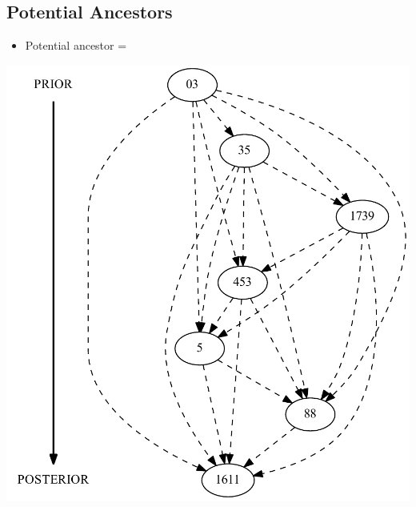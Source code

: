 \documentclass[10pt]{beamer}
\begin{document}
	\subsection{Potential Ancestors}
	\begin{frame}
		\begin{itemize}
			\item Potential ancestor = 
		\end{itemize}
		\begin{center}
			\includegraphics[scale=0.3333]{../img/potential-ancestors.pdf}
		\end{center}
	\end{frame}
\end{document}

